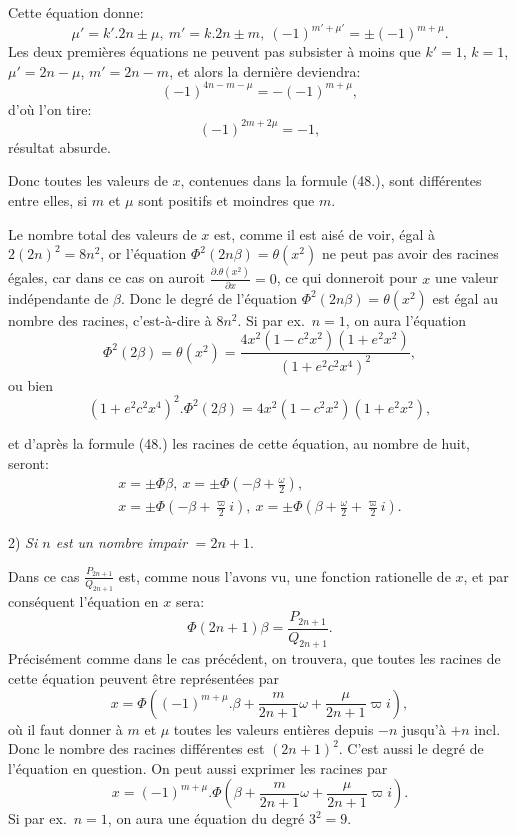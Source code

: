 \documentclass{article}
\begin{document}
Cette équation donne:
\[ \mu'=k'.2n\pm\mu,\ m'=k.2n\pm m,\ (-1)^{m'+\mu'}=\pm(-1)^{m+\mu}. \]
Les deux premières équations ne peuvent pas subsister à moins que $k'=1$, $k=1$, $\mu'=2n-\mu$, $m'=2n-m$, et alors la dernière deviendra:
\[ (-1)^{4n-m-\mu}=-(-1)^{m+\mu}, \]
d'où l'on tire:
\[ (-1)^{2m+2\mu}=-1, \]
résultat absurde.

Donc toutes les valeurs de $x$, contenues dans la formule (48.), sont différentes entre elles, si $m$ et $\mu$ sont positifs et moindres que $m$.

Le nombre total des valeurs de $x$ est, comme il est aisé de voir, égal à $2(2n)^{2}=8n^{2}$, or l'équation $\Phi^{2}(2n\beta)=\theta(x^{2})$ ne peut pas avoir des racines égales, car dans ce cas on auroit $\frac{\partial.\theta(x^{2})}{\partial x}=0$, ce qui donneroit pour $x$ une valeur indépendante de $\beta$. Donc le degré de l'équation $\Phi^{2}(2n\beta)=\theta(x^{2})$ est égal au nombre des racines, c'est-à-dire à $8n^{2}$. Si par ex.\ $n=1$, on aura l'équation
\[ \Phi^{2}(2\beta)=\theta(x^{2})=\frac{4x^{2}(1-c^{2}x^{2})(1+e^{2}x^{2})}{(1+e^{2}c^{2}x^{4})^{2}}, \]
ou bien
\[ (1+e^{2}c^{2}x^{4})^{2}.\Phi^{2}(2\beta)=4x^{2}(1-c^{2}x^{2})(1+e^{2}x^{2}), \]

et d'après la formule (48.) les racines de cette équation, au nombre de huit, seront:
\[ \begin{gathered} x=\pm\Phi\beta,\ x=\pm\Phi\left(-\beta+\frac{\omega}{2}\right),\\ x=\pm\Phi\left(-\beta+\frac{\varpi}{2}i\right),\ x=\pm\Phi\left(\beta+\frac{\omega}{2}+\frac{\varpi}{2}i\right). \end{gathered} \]

2) \emph{Si $n$ est un nombre impair} $=2n+1$.

Dans ce cas $\frac{P_{2n+1}}{Q_{2n+1}}$ est, comme nous l'avons vu, une fonction rationelle de $x$, et par conséquent l'équation en $x$ sera:
\[ \Phi(2n+1)\beta=\frac{P_{2n+1}}{Q_{2n+1}}. \tag{50.} \]
Précisément comme dans le cas précédent, on trouvera, que toutes les racines de cette équation peuvent être représentées par
\[ x=\Phi\left((-1)^{m+\mu}.\beta+\frac{m}{2n+1}\omega+\frac{\mu}{2n+1}\varpi i\right), \tag{51.} \]
où il faut donner à $m$ et $\mu$ toutes les valeurs entières depuis $-n$ jusqu'à $+n$ incl. Donc le nombre des racines différentes est $(2n+1)^{2}$. C'est aussi le degré de l'équation en question. On peut aussi exprimer les racines par
\[ x=(-1)^{m+\mu}.\Phi\left(\beta+\frac{m}{2n+1}\omega+\frac{\mu}{2n+1}\varpi i\right). \]
Si par ex.\ $n=1$, on aura une équation du degré $3^{2}=9$.
\end{document}
